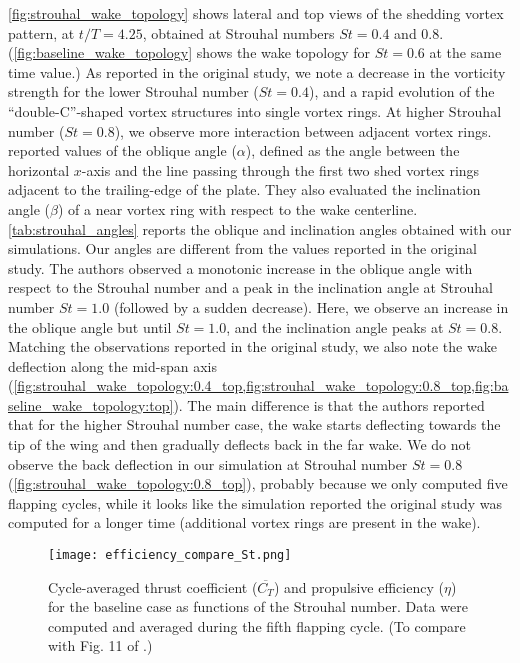 \cref{fig:strouhal_wake_topology} shows lateral and top views of the shedding vortex pattern, at $t/T = 4.25$, obtained at Strouhal numbers $St = 0.4$ and $0.8$.
(\cref{fig:baseline_wake_topology} shows the wake topology for $St = 0.6$ at the same time value.)
As reported in the original study, we note a decrease in the vorticity strength for the lower Strouhal number ($St = 0.4$), and a rapid evolution of the ``double-C''-shaped vortex structures into single vortex rings.
At higher Strouhal number ($St = 0.8$), we observe more interaction between adjacent vortex rings.
\citet{li_dong_2016} reported values of the oblique angle ($\alpha$), defined as the angle between the horizontal $x$-axis and the line passing through the first two shed vortex rings adjacent to the trailing-edge of the plate.
They also evaluated the inclination angle ($\beta$) of a near vortex ring with respect to the wake centerline.
\cref{tab:strouhal_angles} reports the oblique and inclination angles obtained with our simulations.
Our angles are different from the values reported in the original study.
The authors observed a monotonic increase in the oblique angle with respect to the Strouhal number and a peak in the inclination angle at Strouhal number $St = 1.0$ (followed by a sudden decrease).
Here, we observe an increase in the oblique angle but until $St = 1.0$, and the inclination angle peaks at $St = 0.8$.
Matching the observations reported in the original study, we also note the wake deflection along the mid-span axis (\cref{fig:strouhal_wake_topology:0.4_top,fig:strouhal_wake_topology:0.8_top,fig:baseline_wake_topology:top}).
The main difference is that the authors reported that for the higher Strouhal number case, the wake starts deflecting towards the tip of the wing and then gradually deflects back in the far wake.
We do not observe the back deflection in our simulation at Strouhal number $St = 0.8$ (\cref{fig:strouhal_wake_topology:0.8_top}), probably because we only computed five flapping cycles, while it looks like the simulation reported the original study was computed for a longer time (additional vortex rings are present in the wake).

\begin{figure}[!h]
  \centering
  \texttt{[image: efficiency\_compare\_St.png]}
  \caption{Cycle-averaged thrust coefficient ($\overline{C_T}$) and propulsive efficiency ($\eta$) for the baseline case as functions of the Strouhal number. Data were computed and averaged during the fifth flapping cycle. (To compare with Fig. 11 of \citet{li_dong_2016}.)}
  \label{fig:strouhal_propulsive_efficiency}
\end{figure}

